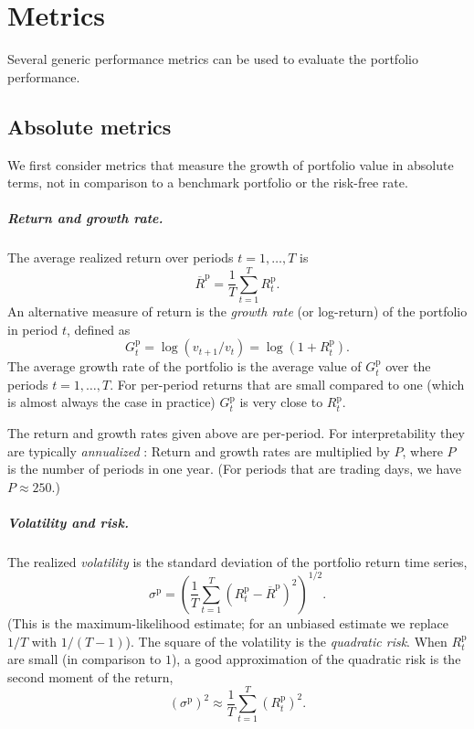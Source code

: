 \documentclass[openany]{now}
\newcommand{\Rp}{R^\mathrm{p}}
\newcommand{\Gp}{G^\mathrm{p}}
\begin{document}
\chapter{Metrics}
\label{s-metrics}
Several generic performance metrics can be used to evaluate the
portfolio performance.

\section{Absolute metrics}
We first consider metrics that measure the growth of portfolio value in absolute terms,
not in comparison to a benchmark portfolio or the risk-free rate.

\paragraph{Return and growth rate.}
The average realized return over periods $t=1,\ldots, T$ is
\[
\overline \Rp =  \frac{1}{T} \sum_{t=1}^{T} \Rp_t.
\]
An alternative measure of return is the \emph{growth rate} (or log-return)
of the portfolio in period $t$, defined as
\[
\Gp_t = \log (v_{t+1} / v_t ) = \log (1+\Rp_t).
\]
The average growth rate of the portfolio
is the average value of $\Gp_t$ over the periods $t=1, \ldots, T$.
For per-period returns that are small compared to one (which is
almost always the case in practice) $\Gp_t$ is very close to $\Rp_t$.

The return and growth rates given above are per-period. For interpretability
they are typically \emph{annualized} \cite{bacon2008practical}:
Return and growth rates are multiplied by $P$,
where $P$ is the number of periods in one year.
(For periods that are trading days, we have $P\approx 250$.)

\paragraph{Volatility and risk.}
The realized \emph{volatility} is the standard deviation of the portfolio
return time series,
\[
\sigma^\mathrm{p} = \left( \frac{1}{T} \sum_{t=1}^{T} (\Rp_t - \overline \Rp)^2
\right)^{1/2}.
\]
(This is the maximum-likelihood estimate; for an unbiased estimate we replace
$1/T$ with $1/(T-1)$).
The square of the volatility is the \emph{quadratic risk}.
When $\Rp_t$ are small (in comparison to $1$),
a good approximation of the quadratic risk is the
second moment of the return,
\[
(\sigma^\mathrm{p})^2 \approx
\frac{1}{T} \sum_{t=1}^{T} (\Rp_t)^2.
\]
\end{document}

